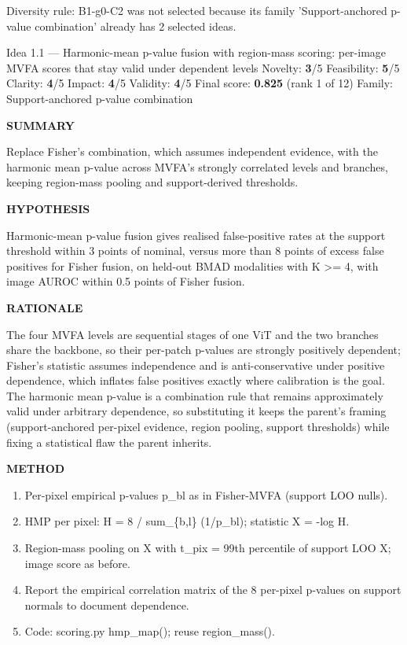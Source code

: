 \documentclass[11pt,a4paper]{article}
\newcommand{\lbl}[1]{{\sffamily\footnotesize\bfseries\color{muted}\MakeUppercase{#1}}\par}
\begin{document}
\begin{note}\small Diversity rule: B1-g0-C2 was not selected because its family 'Support-anchored p-value combination' already has 2 selected ideas.\end{note}
\begin{ideabox}{Idea 1.1 — Harmonic-mean p-value fusion with region-mass scoring: per-image MVFA scores that stay valid under dependent levels}
{\small Novelty: \textbf{3}/5 \quad Feasibility: \textbf{5}/5 \quad Clarity: \textbf{4}/5 \quad Impact: \textbf{4}/5 \quad Validity: \textbf{4}/5 \quad Final score: \textbf{0.825} (rank 1 of 12) \quad Family: Support-anchored p-value combination}\par\smallskip
\lbl{Summary}Replace Fisher's combination, which assumes independent evidence, with the harmonic mean p-value across MVFA's strongly correlated levels and branches, keeping region-mass pooling and support-derived thresholds.

\lbl{Hypothesis}Harmonic-mean p-value fusion gives realised false-positive rates at the support threshold within 3 points of nominal, versus more than 8 points of excess false positives for Fisher fusion, on held-out BMAD modalities with K \textgreater{}= 4, with image AUROC within 0.5 points of Fisher fusion.

\lbl{Rationale}The four MVFA levels are sequential stages of one ViT and the two branches share the backbone, so their per-patch p-values are strongly positively dependent; Fisher's statistic assumes independence and is anti-conservative under positive dependence, which inflates false positives exactly where calibration is the goal. The harmonic mean p-value is a combination rule that remains approximately valid under arbitrary dependence, so substituting it keeps the parent's framing (support-anchored per-pixel evidence, region pooling, support thresholds) while fixing a statistical flaw the parent inherits.

\lbl{Method}\begin{enumerate}[leftmargin=1.6em,itemsep=1pt,topsep=2pt]
\item Per-pixel empirical p-values p\_\allowbreak{}bl as in Fisher-MVFA (support LOO nulls).
\item HMP per pixel: H = 8 / sum\_\allowbreak{}\{b,l\} (1/p\_\allowbreak{}bl); statistic X = -log H.
\item Region-mass pooling on X with t\_\allowbreak{}pix = 99th percentile of support LOO X; image score as before.
\item Report the empirical correlation matrix of the 8 per-pixel p-values on support normals to document dependence.
\item Code: scoring.py hmp\_\allowbreak{}map(); reuse region\_\allowbreak{}mass().
\end{enumerate}


\end{ideabox}
\end{document}
